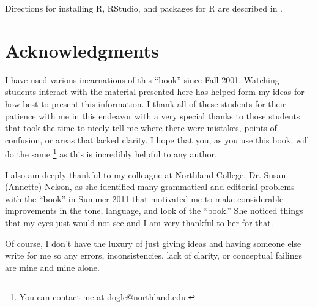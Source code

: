 Directions for installing R, RStudio, and packages for R are described in .

\section*{Acknowledgments}
I have used various incarnations of this ``book'' since Fall 2001.  Watching students interact with the material presented here has helped form my ideas for how best to present this information.  I thank all of these students for their patience with me in this endeavor with a very special thanks to those students that took the time to nicely tell me where there were mistakes, points of confusion, or areas that lacked clarity.  I hope that you, as you use this book, will do the same \footnote{You can contact me at \href{mailto:dogle@northland.edu}{dogle@northland.edu}.} as this is incredibly helpful to any author.

I also am deeply thankful to my colleague at Northland College, Dr. Susan (Annette) Nelson, as she identified many grammatical and editorial problems with the ``book'' in Summer 2011 that motivated me to make considerable improvements in the tone, language, and look of the ``book.''  She noticed things that my eyes just would not see and I am very thankful to her for that.

Of course, I don't have the luxury of just giving ideas and having someone else write for me so any errors, inconsistencies, lack of clarity, or conceptual failings are mine and mine alone.
